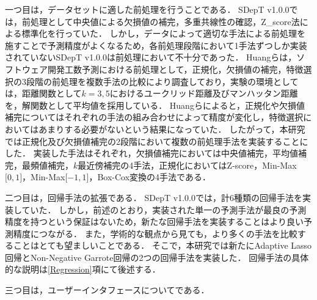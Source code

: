 一つ目は，データセットに適した前処理を行うことである．
SDepT v1.0.0では，前処理として中央値による欠損値の補完，多重共線性の確認，Z\_score法による標準化を行っていた．
しかし，データによって適切な手法による前処理を施すことで予測精度がよくなるため，各前処理段階において1手法ずつしか実装されていないSDepT v1.0.0は前処理において不十分であった．
Huangら\cite{Huang2017}は，ソフトウェア開発工数予測における前処理として，正規化，欠損値の補完，特徴選択の3段階の前処理を複数手法の比較により調査しており，実験の環境としては，距離関数として$k=3,5$におけるユークリッド距離及びマンハッタン距離を，解関数として平均値を採用している．
Huangら\cite{Huang2017}によると，正規化や欠損値補完についてはそれぞれの手法の組み合わせによって精度が変化し，特徴選択においてはあまりする必要がないという結果になっていた．
したがって，本研究では正規化及び欠損値補完の2段階において複数の前処理手法を実装することにした．
実装した手法はそれぞれ，欠損値補完においては中央値補完，平均値補完，最頻値補完，$k$最近傍補完の4手法，正規化においてはZ-score，Min-Max$\lbrack0, 1\rbrack$，Min-Max$\lbrack-1, 1\rbrack$，Box-Cox変換の4手法である．

二つ目は，回帰手法の拡張である．
SDepT v1.0.0では，計6種類の回帰手法を実装していた．
しかし，前述のとおり，実装された単一の予測手法が最良の予測精度を持つという保証はないため，新たな回帰手法を実装することはより良い予測精度につながる．
また，学術的な観点から見ても，より多くの手法を比較することはとても望ましいことである．
そこで，本研究では新たにAdaptive Lasso回帰とNon-Negative Garrote回帰の2つの回帰手法を実装した．
回帰手法の具体的な説明は\ref{Regression}項にて後述する．

三つ目は，ユーザーインタフェースについてである．

